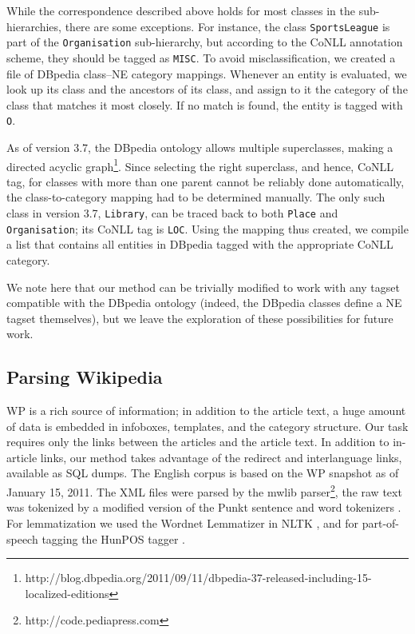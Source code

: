 \documentclass[11pt]{article}
\begin{document}
While the correspondence described above holds for most classes in the
sub-hierarchies, there are some exceptions. For instance, the class
\texttt{SportsLeague} is part of the \texttt{Organisation} sub-hierarchy, but
according to the CoNLL annotation scheme, they should be tagged as
\texttt{MISC}.  To avoid misclassification,
we created a file of DBpedia class--NE category mappings. Whenever an entity is evaluated, we look up its class and the ancestors of its class, and assign to it the category of the class that matches it most closely. If no match is found, the entity is tagged with \texttt{O}. 

As of version 3.7, the DBpedia ontology allows multiple superclasses, making a
directed acyclic
graph\footnote{http://blog.dbpedia.org/2011/09/11/dbpedia-37-released-including-15-localized-editions}. Since
selecting the right superclass, and hence, CoNLL tag, for classes with more
than one parent cannot be reliably done automatically, the class-to-category
mapping had to be determined manually. The only such class in version 3.7,
\texttt{Library}, can be traced back to both \texttt{Place} and
\texttt{Organisation}; its CoNLL tag is \texttt{LOC}.  Using the mapping thus
created, we compile a list that contains all entities in DBpedia tagged with
the appropriate CoNLL category.

We note here that our method can be trivially modified to work with any tagset
compatible with the DBpedia ontology (indeed, the DBpedia classes define a NE
tagset themselves), but we leave the exploration of these possibilities for
future work.

\subsection{Parsing Wikipedia}

WP is a rich source of information; in addition to the article text, a huge
amount of data is embedded in infoboxes, templates, and the category
structure. Our task requires only the links between the articles and the
article text. In addition to in-article links, our method takes advantage of
the redirect and interlanguage links, available as SQL dumps. The English
corpus is based on the WP snapshot as of January 15, 2011. The XML files were
parsed by the mwlib parser\footnote{http://code.pediapress.com}, the raw
text was tokenized by a modified version of the Punkt sentence and word
tokenizers \cite{Kiss:06}. For lemmatization we used the Wordnet Lemmatizer in
NLTK \cite{Bird:09}, and for part-of-speech tagging the HunPOS tagger
\cite{Halacsy:07}.
\end{document}
